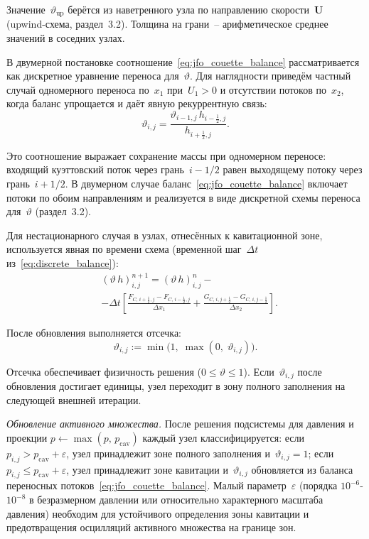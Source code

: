Значение~$\vartheta_{\mathrm{up}}$ берётся из наветренного узла по направлению скорости~$\mathbf{U}$ (upwind-схема, раздел~3.2). Толщина на грани~-- арифметическое среднее значений в соседних узлах.

В двумерной постановке соотношение~\eqref{eq:jfo_couette_balance} рассматривается как дискретное уравнение переноса для~$\vartheta$. Для наглядности приведём частный случай одномерного переноса по~$x_1$ при~$U_1 > 0$ и отсутствии потоков по~$x_2$, когда баланс упрощается и даёт явную рекуррентную связь:
\begin{equation}\label{eq:jfo_theta_update}
  \vartheta_{i,j} = \frac{\vartheta_{i-1,j}\,h_{i-\frac{1}{2},j}}
    {h_{i+\frac{1}{2},j}}.
\end{equation}

Это соотношение выражает сохранение массы при одномерном переносе: входящий куэттовский поток через грань~$i-1/2$ равен выходящему потоку через грань~$i+1/2$. В двумерном случае баланс~\eqref{eq:jfo_couette_balance} включает потоки по обоим направлениям и реализуется в виде дискретной схемы переноса для~$\vartheta$ (раздел~3.2).

Для нестационарного случая в узлах, отнесённых к кавитационной зоне, используется явная по времени схема (временной шаг~$\Delta t$ из~\eqref{eq:discrete_balance}):
\begin{equation}\label{eq:jfo_theta_transient}
\begin{split}
  &(\vartheta\,h)_{i,j}^{n+1} = (\vartheta\,h)_{i,j}^{n} - {} \\
  &- \Delta t \left[
    \frac{F_{C,\,i+\frac{1}{2},j} - F_{C,\,i-\frac{1}{2},j}}{\Delta x_1}
    + \frac{G_{C,\,i,j+\frac{1}{2}} - G_{C,\,i,j-\frac{1}{2}}}{\Delta x_2}
  \right].
\end{split}
\end{equation}

После обновления выполняется отсечка:
\[
  \vartheta_{i,j} := \min\bigl(1,\;\max(0,\;\vartheta_{i,j})\bigr).
\]

Отсечка обеспечивает физичность решения ($0 \leq \vartheta \leq 1$). Если~$\vartheta_{i,j}$ после обновления достигает единицы, узел переходит в зону полного заполнения на следующей внешней итерации.

\textit{Обновление активного множества.}
После решения подсистемы для давления и проекции $p \leftarrow \max(p,\, p_{\mathrm{cav}})$ каждый узел классифицируется: если $p_{i,j} > p_{\mathrm{cav}} + \varepsilon$, узел принадлежит зоне полного заполнения и~$\vartheta_{i,j} = 1$; если $p_{i,j} \leq p_{\mathrm{cav}} + \varepsilon$, узел принадлежит зоне кавитации и~$\vartheta_{i,j}$ обновляется из баланса переносных потоков~\eqref{eq:jfo_couette_balance}. Малый параметр~$\varepsilon$ (порядка $10^{-6}$-$10^{-8}$ в безразмерном давлении или относительно характерного масштаба давления) необходим для устойчивого определения зоны кавитации и предотвращения осцилляций активного множества на границе зон.

